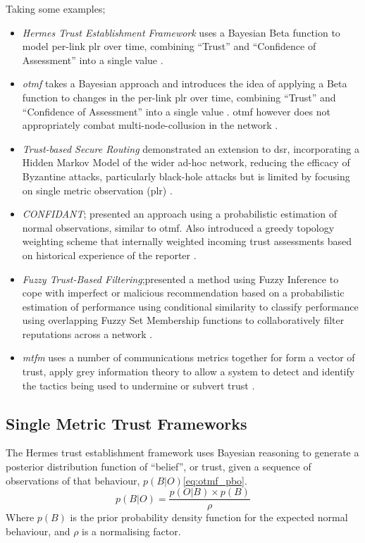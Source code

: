 Taking some examples;
%
\begin{itemize}
  \item \emph{Hermes Trust Establishment Framework} uses a Bayesian Beta function to model per-link \gls{plr} over time, combining ``Trust'' and ``Confidence of Assessment'' into a single value \cite{Zouridaki2005}.
  \item \emph{\acrfull{otmf}} takes a Bayesian approach and introduces the idea of applying a Beta function to changes in the per-link \gls{plr} over time, combining ``Trust'' and ``Confidence of Assessment'' into a single value \cite{Li2008}.
    \gls{otmf} however does not appropriately combat multi-node-collusion in the network \cite{Cho2011}.
  \item \emph{Trust-based Secure Routing} demonstrated an extension to \gls{dsr}, incorporating a Hidden Markov Model of the wider ad-hoc network, reducing the efficacy of Byzantine attacks, particularly black-hole attacks but is limited by focusing on single metric observation (\gls{plr}) \cite{Moe2008a,Cho2011}.
  \item \emph{CONFIDANT}; presented an approach using a probabilistic estimation of normal observations, similar to \gls{otmf}.
    Also introduced a greedy topology weighting scheme that internally weighted incoming trust assessments based on historical experience of the reporter \cite{Buchegger2002}.
  \item \emph{Fuzzy Trust-Based Filtering};presented a method using Fuzzy Inference to cope with imperfect or malicious recommendation based on a probabilistic estimation of performance using conditional similarity to classify performance using overlapping Fuzzy Set Membership functions to collaboratively filter reputations across a network \cite{Luo2008}.
  \item \emph{\acrfull{mtfm}} uses a number of communications metrics together for form a vector of trust, apply grey information theory to allow a system to detect and identify the tactics being used to undermine or subvert trust \cite{Guo11}.
\end{itemize}
%

\subsection{Single Metric Trust Frameworks}

The Hermes trust establishment framework \cite{Zouridaki2005} uses Bayesian reasoning to generate a posterior distribution function of ``belief'', or trust, given a sequence of observations of that behaviour, $p(B|O)$\eqref{eq:otmf_pbo}.
%
\begin{equation}
  p(B|O)  = \frac{p(O|B) \times p(B)}{\rho}
  \label{eq:otmf_pbo}
\end{equation}
%
Where $p(B)$ is the prior probability density function for the expected normal behaviour, and $\rho$ is a normalising factor.

